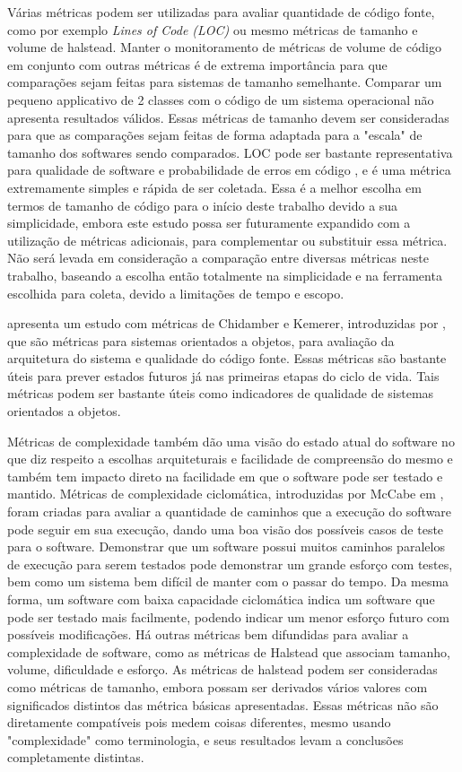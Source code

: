 Várias métricas podem ser utilizadas para avaliar quantidade de código fonte, como por exemplo \textit{Lines of Code (LOC)} ou mesmo métricas de tamanho e volume de halstead. Manter o monitoramento de métricas de volume de código em conjunto com outras métricas é de extrema importância para que comparações sejam feitas para sistemas de tamanho semelhante. Comparar um pequeno applicativo de 2 classes com o código de um sistema operacional não apresenta resultados válidos. Essas métricas de tamanho devem ser consideradas para que as comparações sejam feitas de forma adaptada para a "escala" de tamanho dos softwares sendo comparados. LOC pode ser bastante representativa para qualidade de software e probabilidade de erros em código \cite{validationmetricsfaultprediction}, e é uma métrica extremamente simples e rápida de ser coletada. Essa é a melhor escolha em termos de tamanho de código para o início deste trabalho devido a sua simplicidade, embora este estudo possa ser futuramente expandido com a utilização de métricas adicionais, para complementar ou substituir essa métrica. Não será levada em consideração a comparação entre diversas métricas neste trabalho, baseando a escolha então totalmente na simplicidade e na ferramenta escolhida para coleta, devido a limitações de tempo e escopo.

 apresenta um estudo com métricas de Chidamber e Kemerer, introduzidas por , que são métricas para sistemas orientados a objetos, para avaliação da arquitetura do sistema e qualidade do código fonte. Essas métricas são bastante úteis para prever estados futuros já nas primeiras etapas do ciclo de vida. Tais métricas podem ser bastante úteis como indicadores de qualidade de sistemas orientados a objetos\cite{ooasqualityindicators}. 

Métricas de complexidade também dão uma visão do estado atual do software no que diz respeito a escolhas arquiteturais e facilidade de compreensão do mesmo e também tem impacto direto na facilidade em que o software pode ser testado e mantido. Métricas de complexidade ciclomática, introduzidas por McCabe em , foram criadas para avaliar a quantidade de caminhos que a execução do software pode seguir em sua execução, dando uma boa visão dos possíveis casos de teste para o software. Demonstrar que um software possui muitos caminhos paralelos de execução para serem testados pode demonstrar um grande esforço com testes, bem como um sistema bem difícil de manter com o passar do tempo. Da mesma forma, um software com baixa capacidade ciclomática indica um software que pode ser testado mais facilmente, podendo indicar um menor esforço futuro com possíveis modificações. Há outras métricas bem difundidas para avaliar a complexidade de software, como as métricas de Halstead que associam tamanho, volume, dificuldade e esforço. As métricas de halstead podem ser consideradas como métricas de tamanho, embora possam ser derivados vários valores com significados distintos das métrica básicas apresentadas. Essas métricas não são diretamente compatíveis pois medem coisas diferentes, mesmo usando "complexidade" como terminologia, e seus resultados levam a conclusões completamente distintas.

